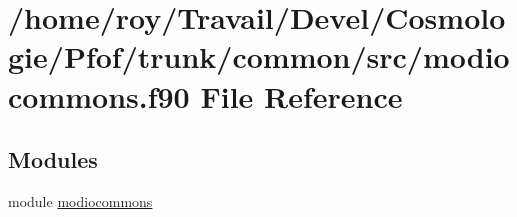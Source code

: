 \hypertarget{modiocommons_8f90}{}\section{/home/roy/\+Travail/\+Devel/\+Cosmologie/\+Pfof/trunk/common/src/modiocommons.f90 File Reference}
\label{modiocommons_8f90}
\subsection*{Modules}
\begin{DoxyCompactItemize}
\item 
module \hyperlink{namespacemodiocommons}{modiocommons}
\end{DoxyCompactItemize}
